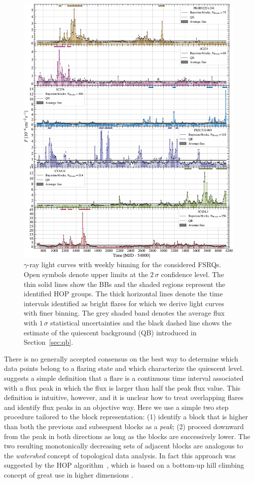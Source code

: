 \documentclass[twocolumn,linenumbers]{aastex62}
\newcommand{\gray}{$\gamma$-ray\xspace}
\begin{document}
\begin{figure}
    \centering
    \includegraphics[width = .9\linewidth]{lc_weekly_tsmin9.pdf}
    \caption{\gray light curves with weekly binning for the considered FSRQs. Open symbols denote upper limits at the $2\,\sigma$ confidence level. The thin solid lines show the BBs and the shaded regions represent the identified HOP groups. The thick horizontal lines denote the time intervals identified as bright flares for which we derive light curves with finer binning.
    The grey shaded band denotes the average flux with $1\,\sigma$ statistical uncertainties and the black dashed line shows the estimate of the quiescent background (QB) introduced in Section~\ref{sec:qb}.}
    \label{fig:weekly}
\end{figure}

There is no generally accepted consensus on the best way to determine which data points belong to a flaring state and which characterize the quiescent level. \citet{2013MNRAS.430.1324N} suggests a simple definition that a flare is a continuous time interval associated with a flux peak in which the flux is larger than half the peak flux value. 
This definition is intuitive, however, and it is unclear how to treat overlapping flares and identify flux peaks in an objective way. 
Here we use a simple two step procedure tailored to the block representation: (1) identify a block that is higher than both the previous and subsequent blocks as a \textit{peak}; (2) proceed downward from the peak in both directions as long as the blocks are successively lower.
The two resulting monotonically decreasing sets of adjacent blocks are analogous to the \textit{watershed} concept of topological data analysis.
In fact this approach was suggested by the 
HOP algorithm~\citep{1998ApJ...498..137E}, which is based on a bottom-up hill climbing concept of great use in higher dimensions \citep[e.g.,][]{2011ApJ...727...48W}.
\end{document}
